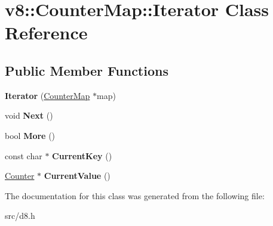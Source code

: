 \hypertarget{classv8_1_1_counter_map_1_1_iterator}{}\section{v8\+:\+:Counter\+Map\+:\+:Iterator Class Reference}
\label{classv8_1_1_counter_map_1_1_iterator}
\subsection*{Public Member Functions}
\begin{DoxyCompactItemize}
\item 
\hypertarget{classv8_1_1_counter_map_1_1_iterator_a85550e73da3d0a69bff7369706809c58}{}{\bfseries Iterator} (\hyperlink{classv8_1_1_counter_map}{Counter\+Map} $\ast$map)\label{classv8_1_1_counter_map_1_1_iterator_a85550e73da3d0a69bff7369706809c58}

\item 
\hypertarget{classv8_1_1_counter_map_1_1_iterator_a4b4c3728478a6922be1cb79819b39d1d}{}void {\bfseries Next} ()\label{classv8_1_1_counter_map_1_1_iterator_a4b4c3728478a6922be1cb79819b39d1d}

\item 
\hypertarget{classv8_1_1_counter_map_1_1_iterator_afd1554bf0d45dd1f20e49abffeb48ae4}{}bool {\bfseries More} ()\label{classv8_1_1_counter_map_1_1_iterator_afd1554bf0d45dd1f20e49abffeb48ae4}

\item 
\hypertarget{classv8_1_1_counter_map_1_1_iterator_a06b41a62e30a550c53081ef7d205b5a9}{}const char $\ast$ {\bfseries Current\+Key} ()\label{classv8_1_1_counter_map_1_1_iterator_a06b41a62e30a550c53081ef7d205b5a9}

\item 
\hypertarget{classv8_1_1_counter_map_1_1_iterator_a67090916d5c46a83bc4f361094825d30}{}\hyperlink{classv8_1_1_counter}{Counter} $\ast$ {\bfseries Current\+Value} ()\label{classv8_1_1_counter_map_1_1_iterator_a67090916d5c46a83bc4f361094825d30}

\end{DoxyCompactItemize}


The documentation for this class was generated from the following file\+:\begin{DoxyCompactItemize}
\item 
src/d8.\+h\end{DoxyCompactItemize}
